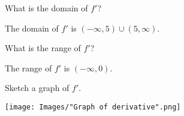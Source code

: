 \documentclass[nooutcomes]{ximera}
\renewenvironment{freeResponse}{
\ifhandout\setbox0\vbox\bgroup\else
\begin{trivlist}\item[\hskip \labelsep\bfseries Solution:\hspace{2ex}]
\fi}
{\ifhandout\egroup\else
\end{trivlist}
\fi}
\begin{document}
\begin{problem}
\begin{itemize}
    \item[(b)]
      What is the domain of $f'$?
      \begin{freeResponse}
        The domain of $f'$ is $(-\infty, 5) \cup (5, \infty)$.        
      \end{freeResponse}


    \item[(c)]
      What is the range of $f'$?
      \begin{freeResponse}
        The range of $f'$ is $(-\infty, 0)$.        
      \end{freeResponse}

    \item[(d)]
      Sketch a graph of $f'$.
      \begin{freeResponse}
        \begin{image}
           \texttt{[image: Images/"Graph of derivative".png]}
        \end{image}
      \end{freeResponse}
  \end{itemize}
\end{problem}
\end{document}
